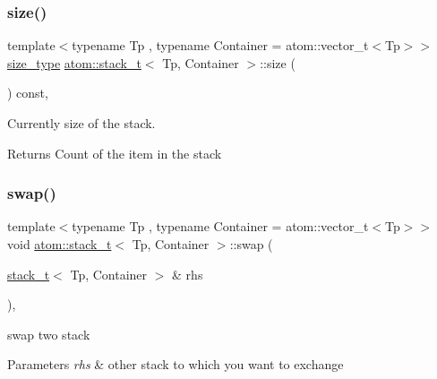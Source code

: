 \subsubsection{\texorpdfstring{size()}{size()}}
{\footnotesize\ttfamily template$<$typename Tp , typename Container  = atom\+::vector\+\_\+t$<$\+Tp$>$$>$ \\
\hyperlink{classatom_1_1stack__t_a43888b80c0b6cceea0509a3646823f98}{size\+\_\+type} \hyperlink{classatom_1_1stack__t}{atom\+::stack\+\_\+t}$<$ Tp, Container $>$\+::size (\begin{DoxyParamCaption}{ }\end{DoxyParamCaption}) const\hspace{0.3cm}{\ttfamily [inline]}, {\ttfamily [noexcept]}}



Currently size of the stack. 

\begin{DoxyReturn}{Returns}
Count of the item in the stack 
\end{DoxyReturn}
\mbox{\label{classatom_1_1stack__t_a05922491d108df9aeae30a5da18d7192}} 
\subsubsection{\texorpdfstring{swap()}{swap()}}
{\footnotesize\ttfamily template$<$typename Tp , typename Container  = atom\+::vector\+\_\+t$<$\+Tp$>$$>$ \\
void \hyperlink{classatom_1_1stack__t}{atom\+::stack\+\_\+t}$<$ Tp, Container $>$\+::swap (\begin{DoxyParamCaption}\item[{\hyperlink{classatom_1_1stack__t}{stack\+\_\+t}$<$ Tp, Container $>$ \&}]{rhs }\end{DoxyParamCaption})\hspace{0.3cm}{\ttfamily [inline]}, {\ttfamily [noexcept]}}



swap two stack 


\begin{DoxyParams}{Parameters}
{\em rhs} & other stack to which you want to exchange \\
\hline
\end{DoxyParams}
\mbox{\label{classatom_1_1stack__t_a80818d88b68e425c679abbfda849c005}} 
